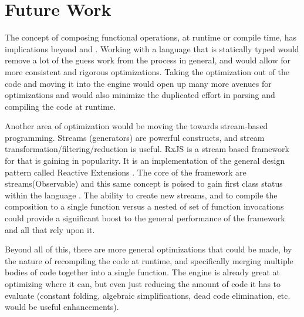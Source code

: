 \section{Future Work}

The concept of composing functional operations, at runtime or compile time, has implications beyond \javascript and \pipelines. Working with a language that is statically typed would remove a lot of the guess work from the process in general, and would allow for more consistent and rigorous optimizations.  Taking the optimization out of the \javascript code and moving it into the engine would open up many more avenues for optimizations and would also minimize the duplicated effort in parsing and compiling the \javascript code at runtime.

Another area of optimization would be moving the \algorithm towards stream-based programming.  Streams (generators) are powerful constructs, and stream transformation/filtering/reduction is useful.  RxJS \cite{rxjs16} is a stream based framework for \javascript that is gaining in popularity. It is an implementation of the general design pattern called Reactive Extensions \cite{rxio16}. The core of the framework are streams(Observable) and this same concept is poised to gain first class status within the \javascript language \cite{observablejs16}. The ability to create new streams, and to compile the composition to a single function versus a nested of set of function invocations could provide a significant boost to the general performance of the framework and all that rely upon it. 

Beyond all of this, there are more general optimizations that could be made, by the nature of recompiling the code at runtime, and specifically merging multiple bodies of code together into a single function.  The \veight \javascript engine is already great at optimizing where it can, but even just reducing the amount of code it has to evaluate (constant folding, algebraic simplifications, dead code elimination, etc. would be useful enhancements).